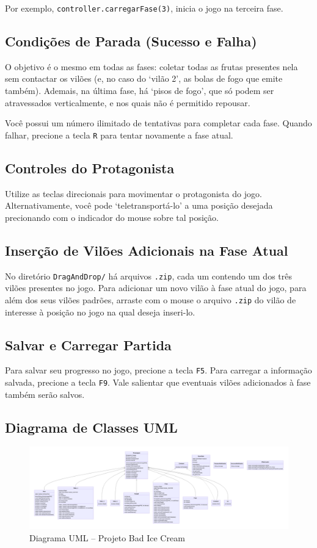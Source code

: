 \documentclass[10pt,a4paper,portuguese]{article}
\begin{document}
        Por exemplo, \verb|controller.carregarFase(3)|, inicia o jogo na terceira fase.

    \subsection{Condições de Parada (Sucesso e Falha)}
        O objetivo é o mesmo em todas as fases: coletar todas as frutas presentes nela sem contactar os vilões (e, no caso do `vilão 2', as bolas de fogo que emite também). Ademais, na última fase, há `pisos de fogo', que só podem ser atravessados verticalmente, e nos quais não é permitido repousar.
        
        Você possui um número ilimitado de tentativas para completar cada fase. Quando falhar, precione a tecla \verb|R| para tentar novamente a fase atual.
        
    \subsection{Controles do Protagonista}
        Utilize as teclas direcionais para movimentar o protagonista do jogo. Alternativamente, você pode `teletransportá-lo' a uma posição desejada precionando com o indicador do mouse sobre tal posição.
        
    \subsection{Inserção de Vilões Adicionais na Fase Atual}
        No diretório \verb|DragAndDrop/| há arquivos \verb|.zip|, cada um contendo um dos três vilões presentes no jogo. Para adicionar um novo vilão à fase atual do jogo, para além dos seus vilões padrões, arraste com o mouse o arquivo \verb|.zip| do vilão de interesse à posição no jogo na qual deseja inseri-lo.
        
    \subsection{Salvar e Carregar Partida}
        Para salvar seu progresso no jogo, precione a tecla \verb|F5|. Para carregar a informação salvada, precione a tecla \verb|F9|. Vale salientar que eventuais vilões adicionados à fase também serão salvos.

\begin{landscape}
    \section{Diagrama de Classes UML}
    \begin{figure}[H]
        \centering
        \includegraphics[width=++\linewidth]{class-diagram.png}
        \caption{Diagrama UML -- Projeto Bad Ice Cream}
        \label{fig:class-diagram}
    \end{figure}
\end{landscape}
\end{document}
